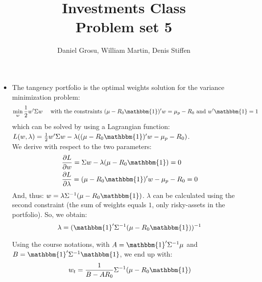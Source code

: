 \documentclass[10pt]{article}
\newenvironment{exercise}[2][Exercise]{\begin{trivlist}
  \item[\hskip \labelsep {\bfseries #1}\hskip \labelsep {\bfseries #2.}]}{\end{trivlist}}
\begin{document}
	
  \renewcommand{\qedsymbol}{\smiley}
	\title{Investments Class \\ Problem set 5}
	\author{Daniel Grosu, William Martin, Denis Stiffen}
		
\maketitle

\begin{exercise}{1}
  \begin{itemize}
    \item The tangency portfolio is the optimal weights solution for the variance minimization problem:
    $$ \min_w{\frac{1}{2}w'\Sigma w} \quad \text{ with the constraints } (\mu-R_0\mathbbm{1})'w = \mu_p-R_0 \text{ and } w'\mathbbm{1} = 1$$ which can be solved by using a Lagrangian function: $L(w,\lambda) =  \frac{1}{2}w'\Sigma w - \lambda((\mu-R_0\mathbbm{1})'w - \mu_p-R_0)$. 
    \\
    We derive with respect to the two parameters:
    \begin{align*}
      &\frac{\partial L}{\partial w} = \Sigma w -\lambda (\mu-R_0\mathbbm{1}) = 0 \\
      &\frac{\partial L}{\partial \lambda} = (\mu-R_0\mathbbm{1})'w - \mu_p-R_0 = 0 
    \end{align*}
    And, thus: $w = \lambda\Sigma^{-1}(\mu-R_0\mathbbm{1})$. $\lambda$ can be calculated using the second constraint (the sum of weights equals $1$, only risky-assets in the portfolio). So, we obtain:
    $$ \lambda = (\mathbbm{1}'\Sigma^{-1}(\mu-R_0\mathbbm{1}))^{-1}$$
    
    Using the course notations, with $A = \mathbbm{1}'\Sigma^{-1}\mu$ and $B=\mathbbm{1}'\Sigma^{-1}\mathbbm{1}$, we end up with:
    $$ w_t = \frac{1}{B-AR_0}\Sigma^{-1}(\mu-R_0\mathbbm{1})$$
    

\end{itemize}
\end{exercise}
\end{document}

